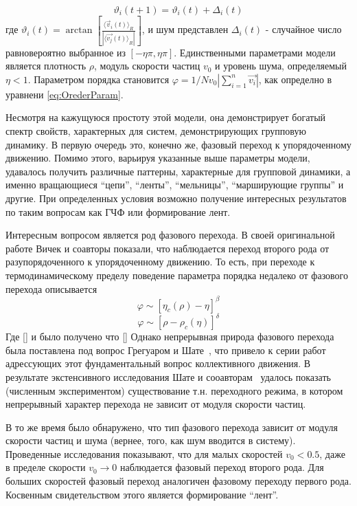     \begin{equation}
        \vartheta_i (t+1) = \vartheta_i(t) + \Delta_i(t)
    \end{equation}
    где $\vartheta_i(t) = \arctan [{\frac{{\langle \vec{v}_i(t) \rangle}_R}{|{\langle \vec{v_j}(t) \rangle}_R|}}]$, и шум представлен $\Delta_i(t)$ - случайное число равновероятно выбранное из $[-\eta \pi,\eta \pi]$. Единственными параметрами модели является плотность $\rho$, модуль скорости частиц $v_0$ и уровень шума, определяемый $\eta < 1$. Параметром порядка становится 
    $\varphi = 1/{N v_0} |{\sum\limits_{i=1}^n \vec{v_i}}|$, как определно в уравнени \ref{eq:OrederParam}.

    Несмотря на кажущуюся простоту этой модели, она демонстрирует богатый спектр свойств, характерных для систем, демонстрирующих групповую динамику. В первую очередь это, конечно же, фазовый переход к упорядоченному движению. Помимо этого, варьируя указанные выше параметры модели, удавалось получить различные паттерны, характерные для групповой динамики, а именно вращающиеся ``цепи'', ``ленты'', ``мельницы'', ``марширующие группы'' и другие. При определенных условия возможно получение интересных результатов по таким вопросам как ГЧФ или формирование лент.

    Интересным вопросом является род фазового перехода. В своей оригинальной работе Вичек и соавторы показали, что наблюдается переход второго рода от разупорядоченного к упорядоченному движению. То есть, при переходе к термодинамическому пределу поведение параметра порядка недалеко от фазового перехода описывается
    \begin{equation}
        \varphi \sim [\eta_c(\rho)-\eta]^\beta
    \end{equation}
    \begin{equation}
        \varphi \sim [\rho-\rho_c(\eta)]^\delta
    \end{equation}
    Где [] и было получено что []
    Однако непрерывная природа фазового перехода была поставлена под вопрос Грегуаром и Шате~\cite{gregoire2004}, что привело к серии работ адрессующих этот фундаментальный вопрос коллективного движения. В результате экстенсивного исследования Шате и сооавторам~\cite{chate2008} удалось показать (численным экспериментом) существование т.н. переходного режима, в котором непрерывный характер перехода не зависит от модуля скорости частиц. 

    В то же время было обнаружено, что тип фазового перехода зависит от модуля скорости частиц и шума (вернее, того, как шум вводится в систему). Проведенные исследования показывают, что для малых скоростей $v_0 < 0.5$, даже в пределе скорости $v_0 \to 0$ наблюдается фазовый переход второго рода. Для больших скоростей фазовый переход аналогичен фазовому переходу первого рода. Косвенным свидетельством этого является формирование ``лент''.\cite{huepe2008}

